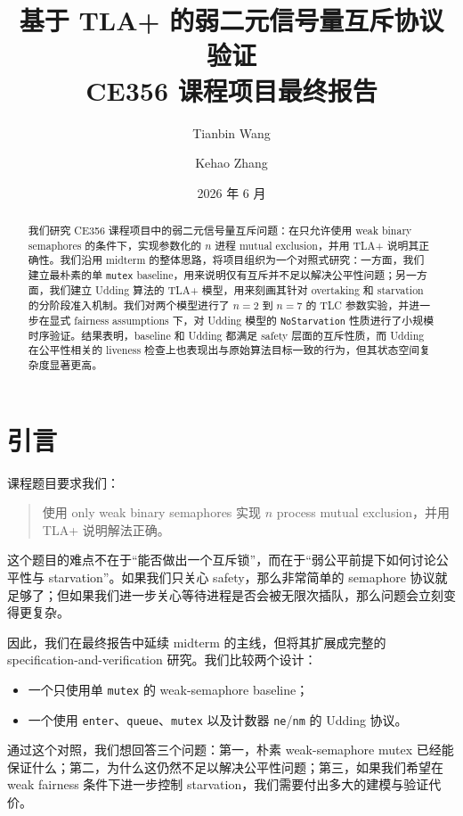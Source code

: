 \documentclass[11pt]{ctexart}
\title{\textbf{基于 TLA+ 的弱二元信号量互斥协议验证}\\CE356 课程项目最终报告}
\author{Tianbin Wang \and Kehao Zhang}
\date{2026 年 6 月}
\begin{document}
\maketitle

\begin{abstract}
我们研究 CE356 课程项目中的弱二元信号量互斥问题：在只允许使用 weak binary semaphores 的条件下，实现参数化的 $n$ 进程 mutual exclusion，并用 TLA+ 说明其正确性。我们沿用 midterm 的整体思路，将项目组织为一个对照式研究：一方面，我们建立最朴素的单 \texttt{mutex} baseline，用来说明仅有互斥并不足以解决公平性问题；另一方面，我们建立 Udding 算法的 TLA+ 模型，用来刻画其针对 overtaking 和 starvation 的分阶段准入机制。我们对两个模型进行了 $n=2$ 到 $n=7$ 的 TLC 参数实验，并进一步在显式 fairness assumptions 下，对 Udding 模型的 \texttt{NoStarvation} 性质进行了小规模时序验证。结果表明，baseline 和 Udding 都满足 safety 层面的互斥性质，而 Udding 在公平性相关的 liveness 检查上也表现出与原始算法目标一致的行为，但其状态空间复杂度显著更高。
\end{abstract}

\section{引言}

课程题目要求我们：

\begin{quote}
使用 only weak binary semaphores 实现 $n$ process mutual exclusion，并用 TLA+ 说明解法正确。
\end{quote}

这个题目的难点不在于“能否做出一个互斥锁”，而在于“弱公平前提下如何讨论公平性与 starvation”。如果我们只关心 safety，那么非常简单的 semaphore 协议就足够了；但如果我们进一步关心等待进程是否会被无限次插队，那么问题会立刻变得更复杂。

因此，我们在最终报告中延续 midterm 的主线，但将其扩展成完整的 specification-and-verification 研究。我们比较两个设计：

\begin{itemize}
  \item 一个只使用单 \texttt{mutex} 的 weak-semaphore baseline；
  \item 一个使用 \texttt{enter}、\texttt{queue}、\texttt{mutex} 以及计数器 \texttt{ne}/\texttt{nm} 的 Udding 协议。
\end{itemize}

通过这个对照，我们想回答三个问题：第一，朴素 weak-semaphore mutex 已经能保证什么；第二，为什么这仍然不足以解决公平性问题；第三，如果我们希望在 weak fairness 条件下进一步控制 starvation，我们需要付出多大的建模与验证代价。
\end{document}
